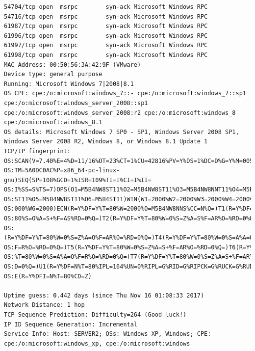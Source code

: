 \documentclass[12pt,a4paper]{article}
\begin{document}
\begin{appendices}
\begin{lstlisting}
54704/tcp open  msrpc        syn-ack Microsoft Windows RPC
54716/tcp open  msrpc        syn-ack Microsoft Windows RPC
61987/tcp open  msrpc        syn-ack Microsoft Windows RPC
61996/tcp open  msrpc        syn-ack Microsoft Windows RPC
61997/tcp open  msrpc        syn-ack Microsoft Windows RPC
61998/tcp open  msrpc        syn-ack Microsoft Windows RPC
MAC Address: 00:50:56:3A:42:9F (VMware)
Device type: general purpose
Running: Microsoft Windows 7|2008|8.1
OS CPE: cpe:/o:microsoft:windows_7::- cpe:/o:microsoft:windows_7::sp1 cpe:/o:microsoft:windows_server_2008::sp1 cpe:/o:microsoft:windows_server_2008:r2 cpe:/o:microsoft:windows_8 cpe:/o:microsoft:windows_8.1
OS details: Microsoft Windows 7 SP0 - SP1, Windows Server 2008 SP1, Windows Server 2008 R2, Windows 8, or Windows 8.1 Update 1
TCP/IP fingerprint:
OS:SCAN(V=7.40%E=4%D=11/16%OT=23%CT=1%CU=42816%PV=Y%DS=1%DC=D%G=Y%M=005056%
OS:TM=5A0DC0AC%P=x86_64-pc-linux-gnu)SEQ(SP=108%GCD=1%ISR=109%TI=I%CI=I%II=
OS:I%SS=S%TS=7)OPS(O1=M5B4NW8ST11%O2=M5B4NW8ST11%O3=M5B4NW8NNT11%O4=M5B4NW8
OS:ST11%O5=M5B4NW8ST11%O6=M5B4ST11)WIN(W1=2000%W2=2000%W3=2000%W4=2000%W5=2
OS:000%W6=2000)ECN(R=Y%DF=Y%T=80%W=2000%O=M5B4NW8NNS%CC=N%Q=)T1(R=Y%DF=Y%T=
OS:80%S=O%A=S+%F=AS%RD=0%Q=)T2(R=Y%DF=Y%T=80%W=0%S=Z%A=S%F=AR%O=%RD=0%Q=)T3
OS:(R=Y%DF=Y%T=80%W=0%S=Z%A=O%F=AR%O=%RD=0%Q=)T4(R=Y%DF=Y%T=80%W=0%S=A%A=O%
OS:F=R%O=%RD=0%Q=)T5(R=Y%DF=Y%T=80%W=0%S=Z%A=S+%F=AR%O=%RD=0%Q=)T6(R=Y%DF=Y
OS:%T=80%W=0%S=A%A=O%F=R%O=%RD=0%Q=)T7(R=Y%DF=Y%T=80%W=0%S=Z%A=S+%F=AR%O=%R
OS:D=0%Q=)U1(R=Y%DF=N%T=80%IPL=164%UN=0%RIPL=G%RID=G%RIPCK=G%RUCK=G%RUD=G)I
OS:E(R=Y%DFI=N%T=80%CD=Z)

Uptime guess: 0.442 days (since Thu Nov 16 01:08:33 2017)
Network Distance: 1 hop
TCP Sequence Prediction: Difficulty=264 (Good luck!)
IP ID Sequence Generation: Incremental
Service Info: Host: SERVER2; OSs: Windows XP, Windows; CPE: cpe:/o:microsoft:windows_xp, cpe:/o:microsoft:windows


\end{lstlisting}
\end{appendices}
\end{document}
